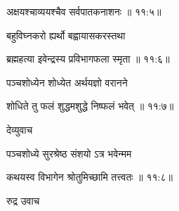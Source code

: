 
{\devanagarifont अक्षयश्चाव्ययश्चैव सर्वपातकनाशनः {॥ ११:५॥} \veg\dontdisplaylinenum }%

{\devanagarifont बहुविघ्नकरो ह्यर्थो बह्वायासकरस्तथा \thinspace{\dandab} \dontdisplaylinenum }%


{\devanagarifont ब्रह्महत्या इवेन्द्रस्य प्रविभागफला स्मृता {॥ ११:६॥} \veg\dontdisplaylinenum }%

{\devanagarifont पञ्चशोध्येन शोध्येत अर्थयज्ञो वरानने \thinspace{\dandab} \dontdisplaylinenum }%


{\devanagarifont शोधिते तु फलं शुद्धमशुद्धे निष्फलं भवेत् {॥ ११:७॥} \veg\dontdisplaylinenum }%

{\devanagarifont देव्युवाच {\dandab}\dontdisplaylinenum  }%

{\devanagarifont पञ्चशोध्ये सुरश्रेष्ठ संशयो ऽत्र भवेन्मम \thinspace{\danda} \dontdisplaylinenum }%


{\devanagarifont कथयस्व विभागेन श्रोतुमिच्छामि तत्त्वतः {॥ ११:८॥} \veg\dontdisplaylinenum }%
 
{\devanagarifont रुद्र उवाच {\dandab}\dontdisplaylinenum  }%
 
